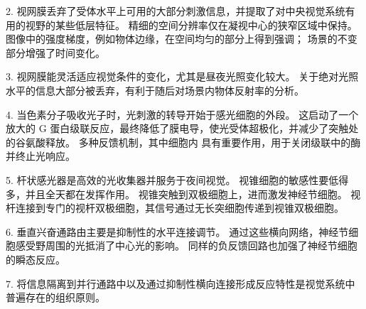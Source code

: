 2. 视网膜丢弃了受体水平上可用的大部分刺激信息，并提取了对中央视觉系统有用的视野的某些低层特征。
精细的空间分辨率仅在凝视中心的狭窄区域中保持。
图像中的强度梯度，例如物体边缘，在空间均匀的部分上得到强调；
场景的不变部分增强了时间变化。


3. 视网膜能灵活适应视觉条件的变化，尤其是昼夜光照变化较大。
关于绝对光照水平的信息大部分被丢弃，有利于随后对场景内物体反射率的分析。 


4. 当色素分子吸收光子时，光刺激的转导开始于感光细胞的外段。
这启动了一个放大的 G 蛋白级联反应，最终降低了膜电导，使光受体超极化，并减少了突触处的谷氨酸释放。 
多种反馈机制，其中细胞内  具有重要作用，用于关闭级联中的酶并终止光响应。 


5. 杆状感光器是高效的光收集器并服务于夜间视觉。
视锥细胞的敏感性要低得多，并且全天都在发挥作用。
视锥突触到双极细胞上，进而激发神经节细胞。
视杆连接到专门的视杆双极细胞，其信号通过无长突细胞传递到视锥双极细胞。 


6. 垂直兴奋通路由主要是抑制性的水平连接调节。
通过这些横向网络，神经节细胞感受野周围的光抵消了中心光的影响。
同样的负反馈回路也加强了神经节细胞的瞬态反应。


7. 将信息隔离到并行通路中以及通过抑制性横向连接形成反应特性是视觉系统中普遍存在的组织原则。


